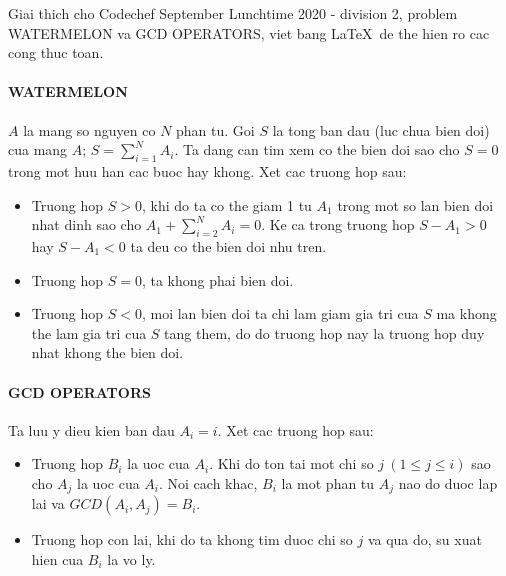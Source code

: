 \documentclass{article}
\begin{document}
    Giai thich cho Codechef September Lunchtime 2020 - division 2, problem WATERMELON va GCD OPERATORS, viet bang \LaTeX \ de the hien ro cac cong thuc toan.

    \paragraph{WATERMELON}
    $A$ la mang so nguyen co $N$ phan tu. Goi $S$ la tong ban dau (luc chua bien doi) cua mang $A$; $\displaystyle S = \sum_{i = 1}^{N} A_i$. Ta dang can tim xem co the bien doi sao cho $S = 0$ trong mot huu han cac buoc hay khong. Xet cac truong hop sau:

    \begin{itemize}
        \item Truong hop $S > 0$, khi do ta co the giam 1 tu $A_1$ trong mot so lan bien doi nhat dinh sao cho $\displaystyle A_1 + \sum_{i = 2}^{N} A_i = 0$. Ke ca trong truong hop $S - A_1 > 0$ hay $S - A_1 < 0$ ta deu co the bien doi nhu tren.
        \item Truong hop $S = 0$, ta khong phai bien doi.
        \item Truong hop $S < 0$, moi lan bien doi ta chi lam giam gia tri cua $S$ ma khong the lam gia tri cua $S$ tang them, do do truong hop nay la truong hop duy nhat khong the bien doi.
    \end{itemize}

    \paragraph{GCD OPERATORS}
    Ta luu y dieu kien ban dau $A_i = i$. Xet cac truong hop sau:

    \begin{itemize}
        \item Truong hop $B_i$ la uoc cua $A_i$. Khi do ton tai mot chi so $j\ (1 \leq j \leq i)$ sao cho $A_j$ la uoc cua $A_i$. Noi cach khac, $B_i$ la mot phan tu $A_j$ nao do duoc lap lai va $GCD(A_i, A_j) = B_i$.
        \item Truong hop con lai, khi do ta khong tim duoc chi so $j$ va qua do, su xuat hien cua $B_i$ la vo ly.
    \end{itemize}
\end{document}
